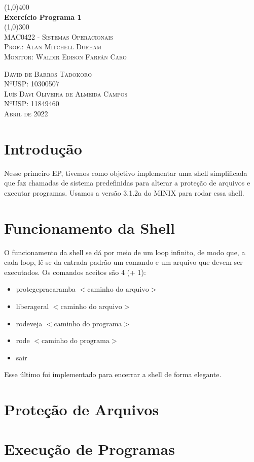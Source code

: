 \documentclass[a4paper, 12pt]{article}
\begin{document}
\begin{titlepage}
	\begin{center}
		\line(1,0){400} \\
		[0.25in]
		\huge{\bfseries Exercício Programa 1} \\
		[0.01in]
		\line(1,0){300} \\
		[0.5cm]
		\textsc{\Large MAC0422 - Sistemas Operacionais} \\
		[1.5cm]
		\textsc{\large Prof.: Alan Mitchell Durham}\\
		\textsc{\large Monitor: Waldir Edison Farfán Caro}\\
		[12cm]
	\end{center}
	\begin{flushright}
		\textsc{David de Barros Tadokoro}\\
		\textsc{NºUSP: 10300507}\\
		\textsc{Luís Davi Oliveira de Almeida Campos}\\
		\textsc{NºUSP: 11849460}\\
		\textsc{Abril de 2022}
	\end{flushright}
\end{titlepage}

\newpage

\section{Introdução}

Nesse primeiro EP, tivemos como objetivo implementar uma shell simplificada que faz chamadas de sistema predefinidas para alterar a proteção de arquivos e executar programas. Usamos a versão 3.1.2a do MINIX para rodar essa shell.

\section{Funcionamento da Shell}

O funcionamento da shell se dá por meio de um loop infinito, de modo que, a cada loop, lê-se da entrada padrão um comando e um arquivo que devem ser executados. Os comandos aceitos são 4 (+ 1):

\begin{itemize}
	\item protegepracaramba $<\textrm{caminho do arquivo}>$
	\item liberageral $<\textrm{caminho do arquivo}>$
	\item rodeveja $<\textrm{caminho do programa}>$
	\item rode $<\textrm{caminho do programa}>$
	\item sair
\end{itemize}

Esse último foi implementado para encerrar a shell de forma elegante.

\section{Proteção de Arquivos}

\section{Execução de Programas}
\end{document}
